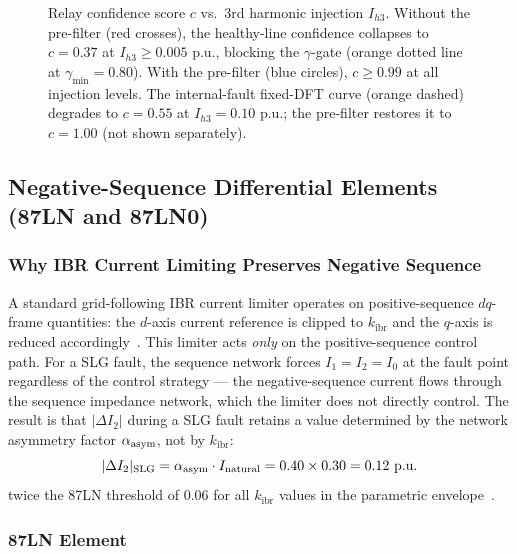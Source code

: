 \documentclass[journal,twoside,10pt]{IEEEtran}
\newcommand{\kibr}{k_{\mathrm{ibr}}}
\newcommand{\pu}{\,\text{p.u.}}
\begin{document}
\begin{figure}[!t]
  \centering
  
  \caption{Relay confidence score $c$ vs.\ 3rd harmonic injection $I_{h3}$.
           Without the pre-filter (red crosses), the healthy-line confidence
           collapses to $c = 0.37$ at $I_{h3} \geq 0.005\,\pu$, blocking
           the $\gamma$-gate (orange dotted line at $\gamma_{\min} = 0.80$).
           With the pre-filter (blue circles), $c \geq 0.99$ at all injection
           levels.  The internal-fault fixed-DFT curve (orange dashed) degrades
           to $c = 0.55$ at $I_{h3} = 0.10\,\pu$; the pre-filter restores it
           to $c = 1.00$ (not shown separately).}
  \label{fig:confidence}
\end{figure}

\subsection{Negative-Sequence Differential Elements (87LN and 87LN0)}
\label{sec:seqelems}

\subsubsection{Why IBR Current Limiting Preserves Negative Sequence}

A standard grid-following IBR current limiter operates on positive-sequence
$dq$-frame quantities: the $d$-axis current reference is clipped to
$\kibr$ and the $q$-axis is reduced accordingly~\cite{Plet2011,Strezoski2017}.
This limiter acts \emph{only} on the positive-sequence control path.
For a SLG fault, the sequence network forces $I_1 = I_2 = I_0$ at the fault
point regardless of the control strategy --- the negative-sequence current
flows through the sequence impedance network, which the limiter does not
directly control.
The result is that $|\Delta I_2|$ during a SLG fault retains a value
determined by the network asymmetry factor $\alpha_{\rm asym}$, not by
$\kibr$:
\begin{equation}
  |\Delta I_2|_{\rm SLG} = \alpha_{\rm asym} \cdot I_{\rm natural}
  = 0.40 \times 0.30 = 0.12\,\pu
  \label{eq:ns_quant}
\end{equation}
twice the 87LN threshold of 0.06\,\pu for all $\kibr$ values in the
parametric envelope~\cite{SAMBP_TR22,Kasztenny2010}.

\subsubsection{87LN Element}
\end{document}
